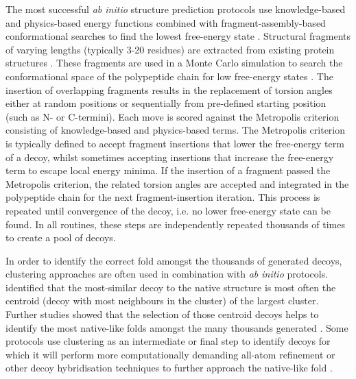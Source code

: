 The most successful \textit{ab initio} structure prediction protocols use knowledge-based and physics-based energy functions combined with fragment-assembly-based conformational searches to find the lowest free-energy state \cite{Rohl2004-dj,Xu2012-jf,Blaszczyk2013-nx,Kosciolek2014-bt,De_Oliveira2017-sg}. Structural fragments of varying lengths (typically 3-20 residues) are extracted from existing protein structures \cite{Abbass2015-qk,Shen2013-wh,Li2008-xu,Kalev2011-sz,Bhattacharya2016-ix,Wang2017-ka,De_Oliveira2015-kb,Gront2011-sv}. These fragments are used in a Monte Carlo simulation to search the conformational space of the polypeptide chain for low free-energy states \cite{Metropolis1949-kp}. The insertion of overlapping fragments results in the replacement of torsion angles either at random positions or sequentially from pre-defined starting position (such as N- or C-termini). Each move is scored against the Metropolis criterion \cite{Metropolis1949-kp} consisting of knowledge-based and physics-based terms. The Metropolis criterion is typically defined to accept fragment insertions that lower the free-energy term of a decoy, whilst sometimes accepting insertions that increase the free-energy term to escape local energy minima. If the insertion of a fragment passed the Metropolis criterion, the related torsion angles are accepted and integrated in the polypeptide chain for the next fragment-insertion iteration. This process is repeated until convergence of the decoy, i.e. no lower free-energy state can be found. In all routines, these steps are independently repeated thousands of times to create a pool of decoys. 

In order to identify the correct fold amongst the thousands of generated decoys, clustering approaches are often used in combination with \textit{ab initio} protocols. \textcite{Shortle1998-fq} identified that the most-similar decoy to the native structure is most often the centroid (decoy with most neighbours in the cluster) of the largest cluster. Further studies showed that the selection of those centroid decoys helps to identify the most native-like folds amongst the many thousands generated \cite{Zhang2004-uz,Bradley2005-lw,Oldziej2005-qp}. Some protocols use clustering as an intermediate or final step to identify decoys for which it will perform more computationally demanding all-atom refinement \cite{Bradley2005-lw} or other decoy hybridisation techniques \cite{Zhang2004-uc,Xu2012-jf,Yang2015-oc} to further approach the native-like fold \cite{Kryshtafovych2016-aq}.

